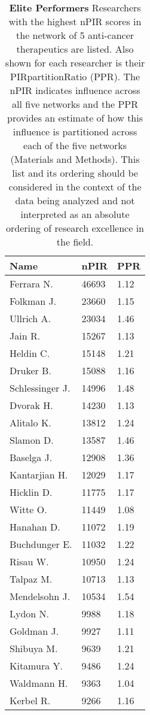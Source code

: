 \documentclass[10pt,letterpaper]{article}
\begin{document}
\begin{table}[!ht]
\centering
\vspace{2.5 mm}
\begin{tabular}{|l| l| l|}
\hline
Name& nPIR & PPR \\
\hline
\hline
Ferrara N.	 & 46693 & 1.12 \\ 
Folkman J. & 23660 & 1.15 \\ 
Ullrich A. & 23034 & 1.46 \\ 
Jain R. & 15267 & 1.13 \\ 
Heldin C.	& 15148 & 1.21 \\ 
Druker B.	& 15088 & 1.16 \\ 
Schlessinger J.	& 14996 & 1.48 \\ 
Dvorak H.	 & 14230 & 1.13 \\ 
 Alitalo K.	& 13812 & 1.24 \\ 
 Slamon D. & 13587 & 1.46 \\ 
 Baselga J. & 12908 & 1.36 \\ 
 Kantarjian H. & 12029 & 1.17 \\ 
 Hicklin D.	 & 11775 & 1.17 \\ 
 Witte O. & 11449 & 1.08 \\ 
 Hanahan D. & 11072 & 1.19 \\ 
 Buchdunger E.	 & 11032 & 1.22 \\ 
 Risau W.	& 10950 & 1.24 \\ 
 Talpaz M.	 & 10713 & 1.13 \\ 
 Mendelsohn J.	 & 10534 & 1.54 \\ 
 Lydon N. & 9988 & 1.18 \\ 
 Goldman J. & 9927 & 1.11 \\ 
 Shibuya M. & 9639 & 1.21 \\ 
 Kitamura Y. & 9486 & 1.24 \\ 
 Waldmann H. & 9363 & 1.04 \\ 
 Kerbel R.	 & 9266 & 1.16 \\ 
   \hline
\end{tabular}
\vspace{2.5 mm}
\caption{
{\bf Elite Performers} Researchers with the highest nPIR scores in the network of 5 anti-cancer therapeutics are listed. Also shown for each researcher is their PIRpartitionRatio (PPR). The nPIR indicates influence across all five networks and the PPR provides an estimate of how this influence is partitioned across each of the five networks (Materials and Methods). This list and its ordering should be considered in the context of the data being analyzed and not interpreted as an absolute ordering of research excellence in the field.}
\label{table2}
\end{table}
\end{document}
